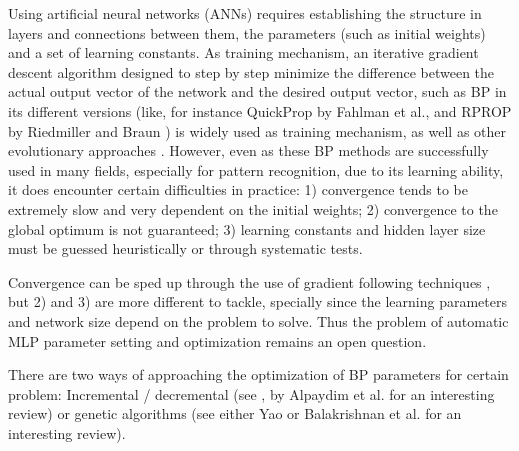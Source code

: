 \documentclass{elsart}
\begin{document}
Using artificial neural networks (ANNs) requires establishing the structure in layers and connections between them, the parameters (such as initial weights) and a set of learning constants. 
As training mechanism, an iterative gradient descent algorithm designed to step by step minimize the difference between the actual output vector of the network and the desired output vector, such as BP in its different versions (like, for instance QuickProp by Fahlman et al.\cite{FahlmanQP}, and RPROP by Riedmiller and Braun \cite{Riedmiller93,Riedmiller94}) is widely used as training mechanism, as well as other evolutionary approaches \cite{competitiveNNGA,Castillo2,Yao98,Yao98b,Miller}.
However, even as these BP methods are successfully used in many fields, especially for pattern recognition, due to its learning ability, it does encounter certain difficulties in practice:
1) convergence tends to be extremely slow and very dependent on the initial weights; 2) convergence to the global optimum is not guaranteed; 3) learning constants and hidden layer size must be guessed heuristically or through systematic tests.

Convergence can be sped up through the use of gradient following techniques \cite{FahlmanCASCOR,Riedmiller93}, but 2) and 3) are more different to tackle, specially since the learning parameters and network size depend on the problem to solve.
Thus the problem of automatic MLP parameter setting and optimization remains an open question.

There are two ways of approaching the optimization of BP parameters for certain problem: Incremental / decremental (see \cite{Alpaydim}, by Alpaydim et al. for an interesting review) or genetic algorithms (see either Yao \cite{Yao92,Yao93} or Balakrishnan et al. \cite{balakrishnan95:EDNA} for an interesting review).
\end{document}
